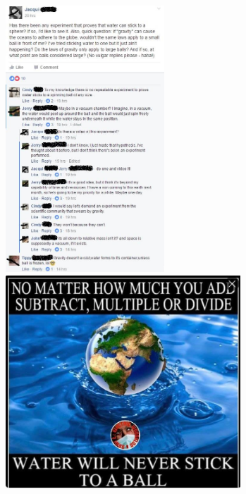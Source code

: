 \includegraphics[height=10cm]{images/gravity_stupid/stupid11}
\includegraphics[height=8cm]{images/gravity_stupid/stupid12}
